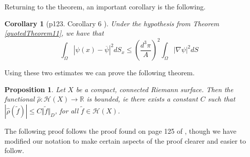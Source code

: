 \documentclass[11pt]{report}
\newtheorem{prop}[thm]{Proposition}
\newtheorem{cor}[thm]{Corollary}
\theoremstyle{definition}
\begin{document}
Returning to the theorem, an important corollary is the following.
\begin{cor}[p123. Corollary 6 \cite{donaldson}]\label{quotedCorollary6}
  Under the hypothesis from Theorem \ref{quotedTheorem11}, we have that 
  \[\int_\Omega |\psi(x) - \overline{\psi}|^2 dS_x\leq \left(\frac{d^3\pi}{A}\right)^2\int_\Omega |\nabla\psi|^2 dS\]
\end{cor}
Using these two estimates we can prove the following theorem.
\begin{prop}\label{PartitionOfUnity}
  Let $X$ be a compact, connected Riemann surface. Then the functional $\hat{\rho}:\mathcal{H}(X) \rightarrow \mathbb{R}$ is bounded, ie there exists a constant $C$ such that $|\hat{\rho}(\tilde{f})| \leq C \Vert \tilde{f} \Vert_D$, for all $\tilde{f} \in \mathcal{H}(X)$.
\end{prop}
The following proof follows the proof found on page 125 of \cite{donaldson}, though we have modified our notation to make certain aspects of the proof clearer and easier to follow.
\end{document}
